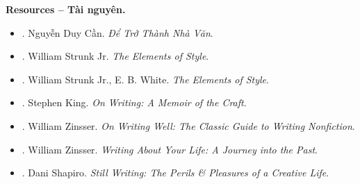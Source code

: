 \documentclass[12pt]{article}
\begin{document}
\noindent\textbf{\textsf{Resources -- Tài nguyên.}}
\begin{itemize}
	\item \cite{Can_dtnv}. Nguyễn Duy Cần. {\it Để Trở Thành Nhà Văn}.
	\item \cite{Strunk_element_style}. William Strunk Jr. {\it The Elements of Style}.
	\item \cite{Strunk_White_element_style}. William Strunk Jr., E. B. White. {\it The Elements of Style}.
	\item \cite{King2000,King2010}. Stephen King. {\it On Writing: A Memoir of the Craft}.
	\item \cite{Zinsser2001,Zinsser2016}. William Zinsser. {\it On Writing Well: The Classic Guide to Writing Nonfiction}.
	\item \cite{Zinsser2005}. William Zinsser. {\it Writing About Your Life: A Journey into the Past}.
	\item \cite{Shapiro2014}. Dani Shapiro. {\it Still Writing: The Perils \& Pleasures of a Creative Life}.
\end{itemize}
\end{document}
